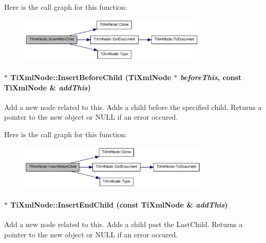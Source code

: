 Here is the call graph for this function:\nopagebreak
\begin{figure}[H]
\begin{center}
\leavevmode
\includegraphics[width=254pt]{class_ti_xml_node_a274db3292218202805c093f66a964cb5_cgraph}
\end{center}
\end{figure}
\hypertarget{class_ti_xml_node_a71e54e393336382bc9875f64aab5cb15}{
\paragraph[{InsertBeforeChild}]{ $\ast$ TiXmlNode::InsertBeforeChild ({\bf TiXmlNode} $\ast$ {\em beforeThis}, \/  const {\bf TiXmlNode} \& {\em addThis})}\hfill}
\label{class_ti_xml_node_a71e54e393336382bc9875f64aab5cb15}
Add a new node related to this. Adds a child before the specified child. Returns a pointer to the new object or NULL if an error occured. 

Here is the call graph for this function:\nopagebreak
\begin{figure}[H]
\begin{center}
\leavevmode
\includegraphics[width=257pt]{class_ti_xml_node_a71e54e393336382bc9875f64aab5cb15_cgraph}
\end{center}
\end{figure}
\hypertarget{class_ti_xml_node_af287a913ce46d8dbf7ef24fec69bbaf0}{
\paragraph[{InsertEndChild}]{ $\ast$ TiXmlNode::InsertEndChild (const {\bf TiXmlNode} \& {\em addThis})}\hfill}
\label{class_ti_xml_node_af287a913ce46d8dbf7ef24fec69bbaf0}
Add a new node related to this. Adds a child past the LastChild. Returns a pointer to the new object or NULL if an error occured. 

